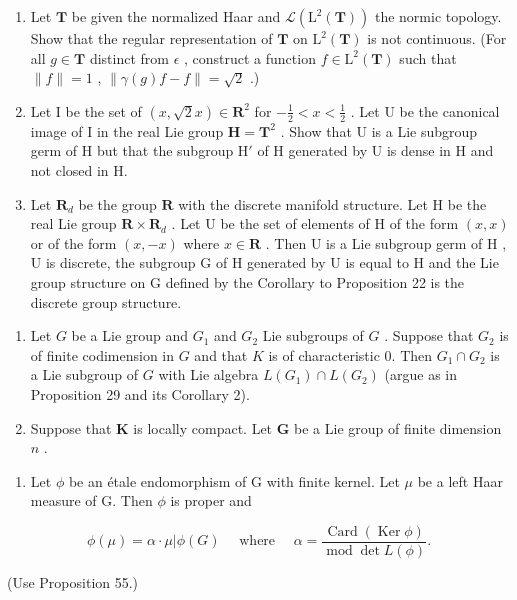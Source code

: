\begin{enumerate}
\def\labelenumi{\arabic{enumi}.}
\setcounter{enumi}{7}
\item
  Let \(\mathbf{T}\) be given the normalized Haar and \(\mathcal{L}(\mathrm{L}^2 (\mathbf{T}))\) the normic topology. Show that the regular representation of \(\mathbf{T}\) on \(\mathrm{L}^2 (\mathbf{T})\) is not continuous. (For all \(g\in \mathbf{T}\) distinct from \(\epsilon\) , construct a function \(f\in \mathrm{L}^2 (\mathbf{T})\) such that \(\| f\| = 1\) , \(\| \gamma (g)f - f\| = \sqrt{2}\) .)
\item
  Let I be the set of \((x, \sqrt{2} x) \in \mathbf{R}^2\) for \(-\frac{1}{2} < x < \frac{1}{2}\) . Let U be the canonical image of I in the real Lie group \(\mathbf{H} = \mathbf{T}^2\) . Show that U is a Lie subgroup germ of H but that the subgroup \(\mathrm{H}'\) of H generated by U is dense in H and not closed in H.
\item
  Let \(\mathbf{R}_d\) be the group \(\mathbf{R}\) with the discrete manifold structure. Let \(\mathrm{H}\) be the real Lie group \(\mathbf{R} \times \mathbf{R}_d\) . Let \(\mathrm{U}\) be the set of elements of \(\mathrm{H}\) of the form \((x, x)\) or of the form \((x, -x)\) where \(x \in \mathbf{R}\) . Then \(\mathrm{U}\) is a Lie subgroup germ of \(\mathrm{H}\) , \(\mathrm{U}\) is discrete, the subgroup \(\mathrm{G}\) of \(\mathrm{H}\) generated by \(\mathrm{U}\) is equal to \(\mathrm{H}\) and the Lie group structure on \(\mathrm{G}\) defined by the Corollary to Proposition 22 is the discrete group structure.
\end{enumerate}


\begin{enumerate}
\def\labelenumi{\arabic{enumi}.}
\item
  Let \(G\) be a Lie group and \(G_1\) and \(G_2\) Lie subgroups of \(G\) . Suppose that \(G_2\) is of finite codimension in \(G\) and that \(K\) is of characteristic 0. Then \(G_1 \cap G_2\) is a Lie subgroup of \(G\) with Lie algebra \(L(G_1) \cap L(G_2)\) (argue as in Proposition 29 and its Corollary 2).
\item
  Suppose that \(\mathbf{K}\) is locally compact. Let \(\mathbf{G}\) be a Lie group of finite dimension \(n\) .
\end{enumerate}

\begin{enumerate}
\def\labelenumi{(\alph{enumi})}
\tightlist
\item
  Let \(\phi\) be an étale endomorphism of G with finite kernel. Let \(\mu\) be a left Haar measure of G. Then \(\phi\) is proper and
\end{enumerate}

\[
\phi (\mu) = \alpha \cdot \mu | \phi (G) \quad \text { where } \quad \alpha = \frac {\operatorname{Card} (\operatorname{Ker} \phi)}{\operatorname{mod} \det L (\phi)}.
\]

(Use Proposition 55.)
